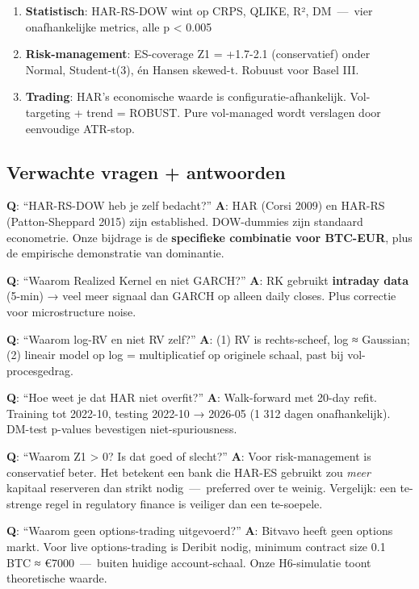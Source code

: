 \begin{enumerate}
\def\labelenumi{\arabic{enumi}.}
\tightlist
\item
  \textbf{Statistisch}: HAR-RS-DOW wint op CRPS, QLIKE, R², DM \,---\, vier onafhankelijke metrics, alle p \textless{} 0.005
\item
  \textbf{Risk-management}: ES-coverage Z1 = +1.7-2.1 (conservatief) onder Normal, Student-t(3), én Hansen skewed-t. Robuust voor Basel III.
\item
  \textbf{Trading}: HAR's economische waarde is configuratie-afhankelijk. Vol-targeting + trend = ROBUST. Pure vol-managed wordt verslagen door eenvoudige ATR-stop.
\end{enumerate}

\hypertarget{verwachte-vragen-antwoorden}{%
\subsection{Verwachte vragen + antwoorden}\label{verwachte-vragen-antwoorden}}

\textbf{Q}: ``HAR-RS-DOW heb je zelf bedacht?''
\textbf{A}: HAR (Corsi 2009) en HAR-RS (Patton-Sheppard 2015) zijn established. DOW-dummies zijn standaard econometrie. Onze bijdrage is de \textbf{specifieke combinatie voor BTC-EUR}, plus de empirische demonstratie van dominantie.

\textbf{Q}: ``Waarom Realized Kernel en niet GARCH?''
\textbf{A}: RK gebruikt \textbf{intraday data} (5-min) → veel meer signaal dan GARCH op alleen daily closes. Plus correctie voor microstructure noise.

\textbf{Q}: ``Waarom log-RV en niet RV zelf?''
\textbf{A}: (1) RV is rechts-scheef, log ≈ Gaussian; (2) lineair model op log = multiplicatief op originele schaal, past bij vol-procesgedrag.

\textbf{Q}: ``Hoe weet je dat HAR niet overfit?''
\textbf{A}: Walk-forward met 20-day refit. Training tot 2022-10, testing 2022-10 → 2026-05 (1 312 dagen onafhankelijk). DM-test p-values bevestigen niet-spuriousness.

\textbf{Q}: ``Waarom Z1 \textgreater{} 0? Is dat goed of slecht?''
\textbf{A}: Voor risk-management is conservatief beter. Het betekent een bank die HAR-ES gebruikt zou \emph{meer} kapitaal reserveren dan strikt nodig \,---\, preferred over te weinig. Vergelijk: een te-strenge regel in regulatory finance is veiliger dan een te-soepele.

\textbf{Q}: ``Waarom geen options-trading uitgevoerd?''
\textbf{A}: Bitvavo heeft geen options markt. Voor live options-trading is Deribit nodig, minimum contract size 0.1 BTC ≈ €7000 \,---\, buiten huidige account-schaal. Onze H6-simulatie toont theoretische waarde.

